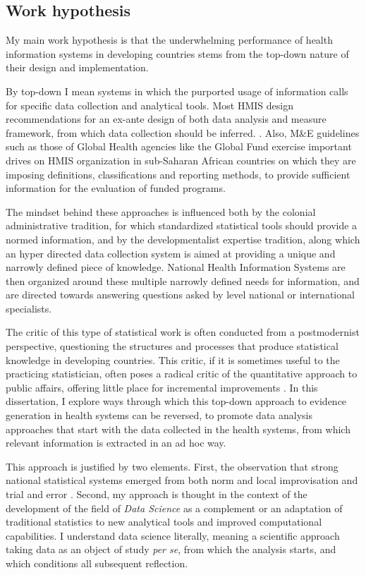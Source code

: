 \subsection{Work hypothesis}

My main work hypothesis is that the underwhelming performance of health information systems in developing countries stems from the top-down nature of their design and implementation.

By top-down I mean systems in which the purported usage of information calls for specific data collection and analytical tools. Most HMIS design recommendations for an ex-ante design of both data analysis and measure framework, from which data collection should be inferred. \cite{lippeveld_routine_2000,rhino_introducing_2003,daltilia_systeme_2005,health_metrics_network_framework_2008}. Also, M\&E guidelines such as those of Global Health agencies like the Global Fund exercise important drives on HMIS organization in sub-Saharan African countries on which they are imposing definitions, classifications and reporting methods, to provide sufficient information for the evaluation of funded programs\cite{the_global_fund_global_2014}.

The mindset behind these approaches is influenced both by the colonial administrative tradition, for which standardized statistical tools should provide a normed information, and by the developmentalist expertise tradition, along which an hyper directed data collection system is aimed at providing a unique and narrowly defined piece of knowledge. National Health Information Systems are then organized around these multiple narrowly defined needs for information, and are directed towards answering questions asked by level national or international specialists.

The critic of this type of statistical work is often conducted from a postmodernist perspective, questioning the structures and processes that produce statistical knowledge in developing countries. This critic, if it is sometimes useful to the practicing statistician, often poses a radical critic of the quantitative approach to public affairs, offering little place for incremental improvements \cite{rottenburg_world_2016}. In this dissertation, I explore ways through which this top-down approach to evidence generation in health systems can be reversed, to promote data analysis approaches that start with the data collected in the health systems, from which relevant information is extracted in an ad hoc way.

This approach is justified by two elements. First, the observation that strong national statistical systems emerged from both norm and local improvisation and trial and error \cite{lecuyer_medecins_1987,chaperon_information_1988}. Second, my approach is thought in the context of the development of the field of \textit{Data Science} as a complement or an adaptation of traditional statistics to new analytical tools and improved computational capabilities. I understand data science literally, meaning a scientific approach taking data as an object of study \textit{per se}, from which the analysis starts, and which conditions all subsequent reflection.

